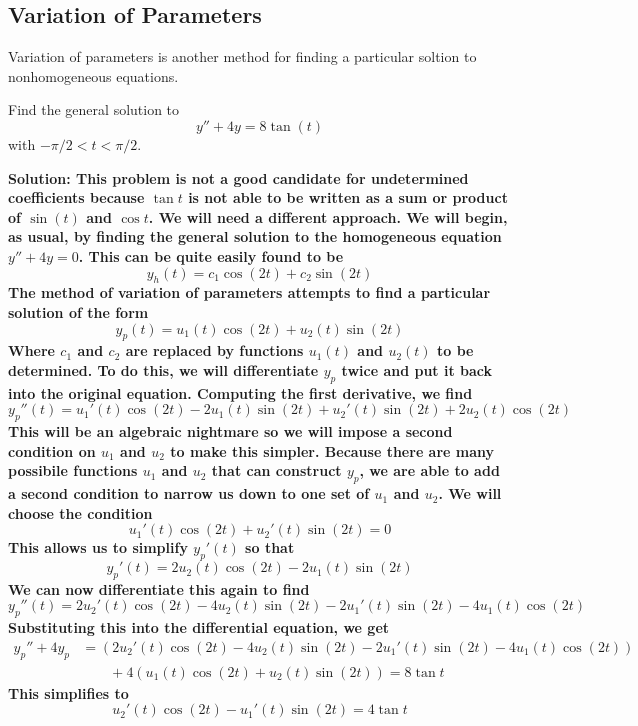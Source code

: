 \subsection{Variation of Parameters}
Variation of parameters is another method for finding a particular soltion to nonhomogeneous equations. 
\begin{example}
    Find the general solution to
    \[ y'' + 4y = 8\tan(t) \]
    with $-\pi/2<t<\pi/2$. \par
    \bf{Solution:} This problem is not a good candidate for undetermined coefficients because $\tan t$ is not able to be written as a sum or product of $\sin(t)$ and $\cos t$. We will need a different approach. We will begin, as usual, by finding the general solution to the homogeneous equation $y'' + 4y = 0$. This can be quite easily found to be
    \[ y_h(t) = c_1\cos(2t) + c_2\sin(2t) \]
    The method of variation of parameters attempts to find a particular solution of the form
    \[ y_p(t) = u_1(t)\cos(2t) + u_2(t)\sin(2t) \]
    Where $c_1$ and $c_2$ are replaced by functions $u_1(t)$ and $u_2(t)$ to be determined. To do this, we will differentiate $y_p$ twice and put it back into the original equation. Computing the first derivative, we find
    \[ y_p''(t) = u_1'(t)\cos(2t) - 2u_1(t)\sin(2t) + u_2'(t)\sin(2t) + 2u_2(t)\cos(2t) \]
    This will be an algebraic nightmare so we will impose a second condition on $u_1$ and $u_2$ to make this simpler. Because there are many possibile functions $u_1$ and $u_2$ that can construct $y_p$, we are able to add a second condition to narrow us down to one set of $u_1$ and $u_2$. We will choose the condition
    \begin{equation} \label{restr}
        u_1'(t)\cos(2t) + u_2'(t)\sin(2t) = 0
    \end{equation}
    This allows us to simplify $y_p'(t)$ so that
    \[ y_p'(t) = 2u_2(t)\cos(2t) - 2u_1(t)\sin(2t) \]
    We can now differentiate this again to find
    \[ y_p''(t) = 2u_2'(t)\cos(2t) - 4u_2(t)\sin(2t) - 2u_1'(t)\sin(2t) - 4u_1(t)\cos(2t) \]
    Substituting this into the differential equation, we get
    \begin{align*}
        y_p'' + 4y_p &= (2u_2'(t)\cos(2t) - 4u_2(t)\sin(2t) - 2u_1'(t)\sin(2t) - 4u_1(t)\cos(2t)) \\
        &\quad\quad + 4(u_1(t)\cos(2t) + u_2(t)\sin(2t)) = 8\tan t
    \end{align*}
    This simplifies to
    \begin{equation} \label{restr2}
        u_2'(t)\cos(2t) - u_1'(t)\sin(2t) = 4\tan t

\end{equation}
\end{example}
